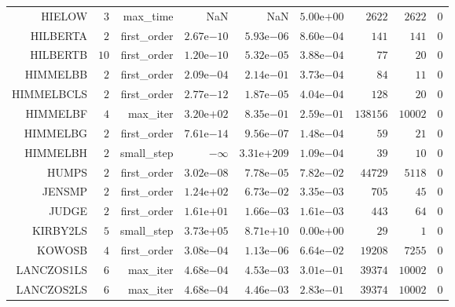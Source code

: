 \begin{longtable}{rrrrrrrrr}
HIELOW & \(     3\) & max\_time &       NaN &       NaN & \( 5.00\)e\(+00\) & \(  2622\) & \(  2622\) & \(     0\) \\
HILBERTA & \(     2\) & first\_order & \( 2.67\)e\(-10\) & \( 5.93\)e\(-06\) & \( 8.60\)e\(-04\) & \(   141\) & \(   141\) & \(     0\) \\
HILBERTB & \(    10\) & first\_order & \( 1.20\)e\(-10\) & \( 5.32\)e\(-05\) & \( 3.88\)e\(-04\) & \(    77\) & \(    20\) & \(     0\) \\
HIMMELBB & \(     2\) & first\_order & \( 2.09\)e\(-04\) & \( 2.14\)e\(-01\) & \( 3.73\)e\(-04\) & \(    84\) & \(    11\) & \(     0\) \\
HIMMELBCLS & \(     2\) & first\_order & \( 2.77\)e\(-12\) & \( 1.87\)e\(-05\) & \( 4.04\)e\(-04\) & \(   128\) & \(    20\) & \(     0\) \\
HIMMELBF & \(     4\) & max\_iter & \( 3.20\)e\(+02\) & \( 8.35\)e\(-01\) & \( 2.59\)e\(-01\) & \(138156\) & \( 10002\) & \(     0\) \\
HIMMELBG & \(     2\) & first\_order & \( 7.61\)e\(-14\) & \( 9.56\)e\(-07\) & \( 1.48\)e\(-04\) & \(    59\) & \(    21\) & \(     0\) \\
HIMMELBH & \(     2\) & small\_step & \(-\infty\) & \(3.31\)e\(+209\) & \( 1.09\)e\(-04\) & \(    39\) & \(    10\) & \(     0\) \\
HUMPS & \(     2\) & first\_order & \( 3.02\)e\(-08\) & \( 7.78\)e\(-05\) & \( 7.82\)e\(-02\) & \( 44729\) & \(  5118\) & \(     0\) \\
JENSMP & \(     2\) & first\_order & \( 1.24\)e\(+02\) & \( 6.73\)e\(-02\) & \( 3.35\)e\(-03\) & \(   705\) & \(    45\) & \(     0\) \\
JUDGE & \(     2\) & first\_order & \( 1.61\)e\(+01\) & \( 1.66\)e\(-03\) & \( 1.61\)e\(-03\) & \(   443\) & \(    64\) & \(     0\) \\
KIRBY2LS & \(     5\) & small\_step & \( 3.73\)e\(+05\) & \( 8.71\)e\(+10\) & \( 0.00\)e\(+00\) & \(    29\) & \(     1\) & \(     0\) \\
KOWOSB & \(     4\) & first\_order & \( 3.08\)e\(-04\) & \( 1.13\)e\(-06\) & \( 6.64\)e\(-02\) & \( 19208\) & \(  7255\) & \(     0\) \\
LANCZOS1LS & \(     6\) & max\_iter & \( 4.68\)e\(-04\) & \( 4.53\)e\(-03\) & \( 3.01\)e\(-01\) & \( 39374\) & \( 10002\) & \(     0\) \\
LANCZOS2LS & \(     6\) & max\_iter & \( 4.68\)e\(-04\) & \( 4.46\)e\(-03\) & \( 2.83\)e\(-01\) & \( 39374\) & \( 10002\) & \(     0\) \\

\end{longtable}

